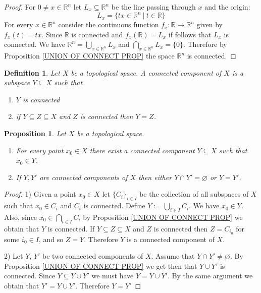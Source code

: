 \documentclass[11pt, letterpaper, oneside]{report}
\theoremstyle{pplain}
\newtheorem{proposition}[theorem]{Proposition}
\newtheorem{ITERMVALUE THM}[theorem]{Intermediate Value Theorem}
\newtheorem{HEINEBOREL THM}[theorem]{Heine-Borel Theorem}
\newtheorem{UMETR THM}[theorem]{Urysohn Metrization Theorem}
\newtheorem{UMETR2 THM}[theorem]{Urysohn Metrization Theorem (v.2)}
\theoremstyle{ddefinition}
\newtheorem{definition}[theorem]{Definition}
\theoremstyle{nnn}
\newtheorem{TDA NN}[theorem]{Topological Data Analysis. }
\theoremstyle{eexercise}
\newcommand{\R}{{\mathbb R}}
\newcommand{\benu}{\begin{enumerate}}
\newcommand{\eenu}{\end{enumerate}}
\begin{document}
\begin{proof}
For $0\neq x\in \R^{n}$ let $L_{x}\subseteq \R^{n}$ be the line passing through $x$ and the origin:
$$L_{x} = \{ tx\in \R^{n} \ | \ t\in \R \}$$
For every $x\in \R^{n}$ consider the  continuous function $f_{x}\colon \R \to \R^{n}$
given by $f_{x}(t) = tx$. Since $\R$ is connected and $f_{x}(\R) = L_{x}$ if follows that $L_{x}$ is connected. 
We have $\R^{n} = \bigcup_{x\in \R^{n}} L_{x}$ and $\bigcap_{x\in \R^{n}} L_{x} = \{0\}$. Therefore 
by Proposition \ref{UNION OF CONNECT PROP} the space $\R^{n}$ is connected. 
\end{proof}

\begin{definition}
Let $X$ be a topological space. A \emph{connected component} of $X$ 
is a subspace $Y\subseteq X$ such that 
\benu
\item $Y$ is connected
\item if $Y\subseteq Z \subseteq X$ and  $Z$ is  connected then $Y= Z$. 
\eenu
\end{definition}


\begin{proposition}
\label{CONN COMP PROP}
Let  $X$ be a topological space.
\benu
\item For every point $x_{0}\in X$ there exist a  connected component $Y\subseteq X$ such that $x_{0}\in Y$.
\item If $Y, Y'$ are connected components of $X$ then either $Y\cap Y' = \varnothing$ or $Y= Y'$.
\eenu
\end{proposition}

\begin{proof}
1)  Given a point $x_{0}\in X$ let $\{C_{i}\}_{i\in I}$ be the collection of all subspaces of $X$ such that 
$x_{0}\in C_{i}$ and $C_{i}$ is connected. Define 
$Y:= \bigcup_{i\in I} C_{i}$.
We have  $x_{0}\in Y$. Also, since $x_{0}\in \bigcap_{i\in I} C_{i}$ by  
Proposition \ref{UNION OF CONNECT PROP} we obtain that $Y$ is connected. If $Y\subseteq Z \subseteq X$
and $Z$ is connected then $Z= C_{i_{0}}$ for some $i_{0}\in I$, and so $Z =  Y$. Therefore $Y$ is a 
connected component of $X$. 

2) Let $Y$, $Y'$ be two connected components of $X$. Assume  that $Y\cap Y'\neq \varnothing$.  
By  Proposition \ref{UNION OF CONNECT PROP}  we get then that  $Y\cup Y'$ is connected. Since 
$Y\subseteq Y\cup Y'$ we must have $Y= Y\cup Y'$. By the same argument we obtain that $Y'= Y\cup Y'$. 
Therefore $Y= Y'$

\end{proof}
\end{document}
